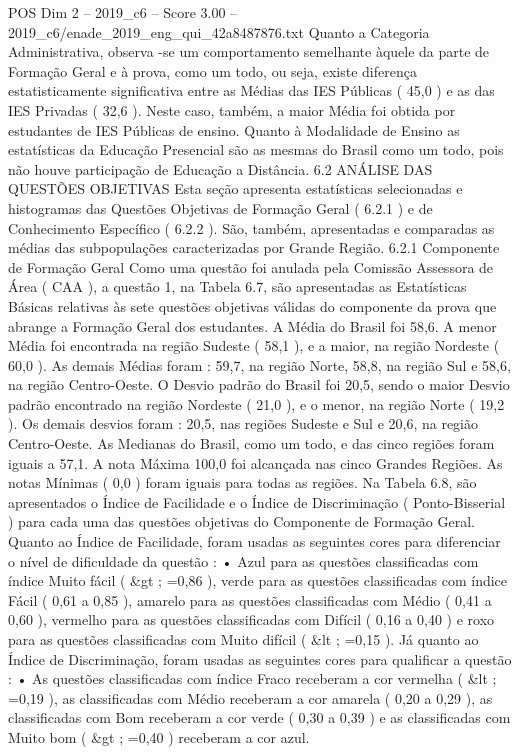 \begin{textsample}{POS Dim 2 – 2019\_c6 – Score 3.00 – 2019\_c6/enade\_2019\_eng\_qui\_42a8487876.txt}
Quanto a Categoria Administrativa, observa -se um comportamento semelhante àquele da parte de Formação Geral e à prova, como um todo, ou seja, existe diferença estatisticamente significativa entre as Médias das IES Públicas ( 45,0 ) e as das IES Privadas ( 32,6 ).
Neste caso, também, a maior Média foi obtida por estudantes de IES Públicas de ensino.
Quanto à Modalidade de Ensino as estatísticas da Educação Presencial são as mesmas do Brasil como um todo, pois não houve participação de Educação a Distância. 6.2 ANÁLISE DAS QUESTÕES OBJETIVAS Esta seção apresenta estatísticas selecionadas e histogramas das Questões Objetivas de Formação Geral ( 6.2.1 ) e de Conhecimento Específico ( 6.2.2 ).
São, também, apresentadas e comparadas as médias das subpopulações caracterizadas por Grande Região. 6.2.1 Componente de Formação Geral Como uma questão foi anulada pela Comissão Assessora de Área ( CAA ), a questão 1, na Tabela 6.7, são apresentadas as Estatísticas Básicas relativas às sete questões objetivas válidas do componente da prova que abrange a Formação Geral dos estudantes.
A Média do Brasil foi 58,6.
A menor Média foi encontrada na região Sudeste ( 58,1 ), e a maior, na região Nordeste ( 60,0 ).
As demais Médias foram : 59,7, na região Norte, 58,8, na região Sul e 58,6, na região Centro-Oeste.
O Desvio padrão do Brasil foi 20,5, sendo o maior Desvio padrão encontrado na região Nordeste ( 21,0 ), e o menor, na região Norte ( 19,2 ).
Os demais desvios foram : 20,5, nas regiões Sudeste e Sul e 20,6, na região Centro-Oeste.
As Medianas do Brasil, como um todo, e das cinco regiões foram iguais a 57,1.
A nota Máxima 100,0 foi alcançada nas cinco Grandes Regiões.
As notas Mínimas ( 0,0 ) foram iguais para todas as regiões.
Na Tabela 6.8, são apresentados o Índice de Facilidade e o Índice de Discriminação ( Ponto-Bisserial ) para cada uma das questões objetivas do Componente de Formação Geral.
Quanto ao Índice de Facilidade, foram usadas as seguintes cores para diferenciar o nível de dificuldade da questão : • Azul para as questões classificadas com índice Muito fácil ( \&gt ; =0,86 ), verde para as questões classificadas com índice Fácil ( 0,61 a 0,85 ), amarelo para as questões classificadas com Médio ( 0,41 a 0,60 ), vermelho para as questões classificadas com Difícil ( 0,16 a 0,40 ) e roxo para as questões classificadas com Muito difícil ( \&lt ; =0,15 ).
Já quanto ao Índice de Discriminação, foram usadas as seguintes cores para qualificar a questão : • As questões classificadas com índice Fraco receberam a cor vermelha ( \&lt ; =0,19 ), as classificadas com Médio receberam a cor amarela ( 0,20 a 0,29 ), as classificadas com Bom receberam a cor verde ( 0,30 a 0,39 ) e as classificadas com Muito bom ( \&gt ; =0,40 ) receberam a cor azul.

\end{textsample}
